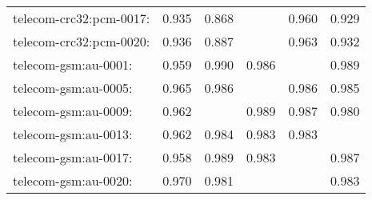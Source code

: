 \begin{longtable}{lrrrrr}
telecom-crc32:pcm-0017: & 0.935 & 0.868 & \color{Green}{0.965} & 0.960 & 0.929 \\
telecom-crc32:pcm-0020: & 0.936 & 0.887 & \color{Green}{0.968} & 0.963 & 0.932 \\
telecom-gsm:au-0001: & 0.959 & 0.990 & 0.986 & \color{Green}{0.992} & 0.989 \\
telecom-gsm:au-0005: & 0.965 & 0.986 & \color{Green}{0.987} & 0.986 & 0.985 \\
telecom-gsm:au-0009: & 0.962 & \color{Green}{0.990} & 0.989 & 0.987 & 0.980 \\
telecom-gsm:au-0013: & 0.962 & 0.984 & 0.983 & 0.983 & \color{Green}{0.988} \\
telecom-gsm:au-0017: & 0.958 & 0.989 & 0.983 & \color{Green}{0.991} & 0.987 \\
telecom-gsm:au-0020: & 0.970 & 0.981 & \color{Green}{0.990} & \color{Green}{0.990} & 0.983 \\
\end{longtable}
